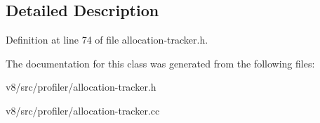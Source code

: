 \subsection{Detailed Description}


Definition at line 74 of file allocation-\/tracker.\+h.



The documentation for this class was generated from the following files\+:\begin{DoxyCompactItemize}
\item 
v8/src/profiler/allocation-\/tracker.\+h\item 
v8/src/profiler/allocation-\/tracker.\+cc\end{DoxyCompactItemize}
